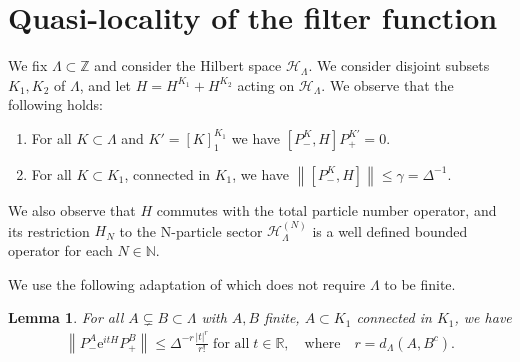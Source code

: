 \documentclass[12pt, a4paper,reqno]{amsart}
\numberwithin{equation}{section}
\newtheorem{lemma}[theorem]{Lemma}
\newcommand\R{\mathbb R}
\newcommand\N{\mathbb N}
\newcommand\Z{\mathbb Z}
\newcommand\e{\mathrm{e}}
\newcommand\cH{\mathcal{H}}
\newcommand\be{\begin{equation}\begin{aligned}}
\newcommand\ee{\end{aligned}\end{equation}}
\newcommand{\abs}[1]{\left\lvert #1 \right\rvert}
\newcommand{\norm}[1]{\left\lVert #1 \right\rVert}
\newcommand{\pa}[1]{\left( #1 \right)}
\newcommand\La{\Lambda}
\newcommand{\up}[1]{^{\left(#1\right)}}
\newcommand{\qtx}[1]{\quad\text{#1}\quad}
\newcommand{\sqtx}[1]{\;\text{#1}\;}
\begin{document}
\section{Quasi-locality of the filter function} \label{app:quasil}  
 We fix $\La \subset \Z$ and consider the Hilbert space $\cH_\La$.  We  consider  disjoint subsets $K_1,K_2$ of $\La$,   and  let $H=H^{K_1} +H^{K_2}$ acting on $\cH_\La$.  We observe that the following holds:
 \begin{enumerate}
 \item For all   $K \subset {\La} $  and $K'=[K]_1^{K_1}$  we have   $[P_-^{K},H]P_+^{K'}=0$.
\item For all   $K \subset K_1 $,  connected in  $K_1$,   we have  $\norm{[P_-^{K},H]}\le  \gamma= \Delta^{-1}  $.
 \end{enumerate}
 
 We also observe that $H$ commutes with the total particle number operator, and its restriction $H_N$ to the N-particle sector $\cH_\La\up{N}$  is a well defined bounded operator  for each $N\in \N$.
 
 



We  use the following adaptation of 
 \cite[Lemma B.1]{EK22} which does not require $\La$ to be finite. 
 
 \begin{lemma} \label{lem:F}   For all $A\subsetneq B\subset {\La}$ with  $A, B$ finite,  $A\subset K_1$  connected in ${K_1}$,   we have
 \be \label{eq:loca1}
\norm{P_-^{A}\e^{itH} P_+^{B}}\le  \Delta^{-r}\frac{  \abs{t}^r}{r!} \sqtx{for all} t\in \R, \qtx{where} r=d_{\La} \pa{A,B^c}. 
\ee 
  \end{lemma} 
 
\end{document}
